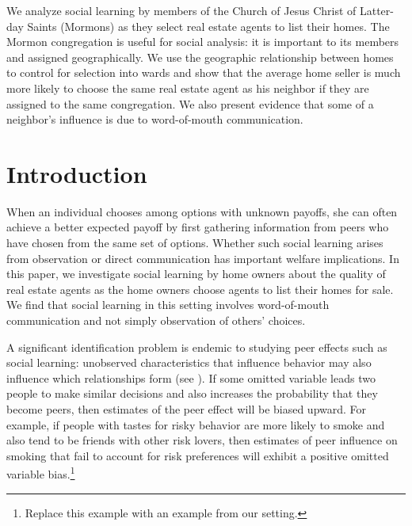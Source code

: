\documentclass[12pt]{article}
\begin{document}
{\abstract
    We analyze social learning by members of the Church of Jesus Christ of Latter-day Saints (Mormons) as they select
    real estate agents to list their homes. The Mormon congregation is useful for social analysis: it is important to its members and assigned
    geographically. We use the geographic relationship between homes to control for selection into wards and show that the average home seller is much
    more likely to choose the same real estate agent as his neighbor if they are assigned to the same congregation. We also present evidence that some
    of a neighbor's influence is due to word-of-mouth communication.
}



\section{Introduction}
    When an individual chooses among options with unknown payoffs, she can often achieve a better expected payoff by first gathering information from peers who have chosen from the same set of options. Whether such social learning arises from observation or direct communication has important welfare implications. In this paper, we investigate social learning by home owners about the quality of real estate agents as the home owners
    choose agents to list their homes for sale.  We find that social learning in this setting involves word-of-mouth communication and not simply observation of others' choices.
    
    A significant identification problem is endemic to studying peer effects such as social learning: unobserved characteristics that influence behavior may also influence which relationships
    form (see ). If some omitted variable leads two people to make similar
    decisions and also increases the probability that they become peers, then estimates of the peer effect will be biased upward. For example, if people with tastes for risky behavior are more likely to smoke and also tend to be friends with other risk lovers, then estimates of peer
    influence on smoking that fail to account for risk preferences will exhibit a positive omitted variable bias.\footnote{Replace this example with an example from our setting.}
\end{document}
